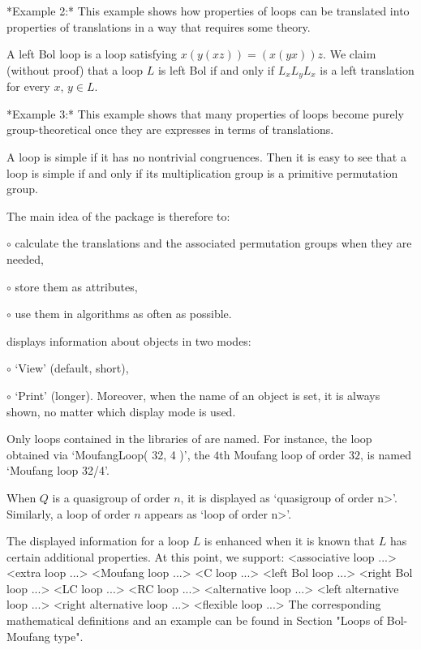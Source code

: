 *Example 2:* This example shows how properties of loops can be translated into
properties of translations in a way that requires some theory.

A left Bol loop is a loop satisfying $x(y(xz)) = (x(yx))z$. We
claim (without proof) that a loop $L$ is left Bol if and only if $L_xL_yL_x$ is
a left translation for every $x$, $y\in L$.

*Example 3:* This example shows that many properties of loops become purely
group-theoretical once they are expresses in terms of translations.

A loop is simple if it has no nontrivial congruences. Then
it is easy to see that a loop is simple if and only if its multiplication group
is a primitive permutation group.

\medskip

The main idea of the package is therefore to:
\beginlist%
\item{$\circ$} calculate the translations and the associated permutation
    groups when they are needed,
\item{$\circ$} store them as attributes,
\item{$\circ$} use them in algorithms as often as possible.
\endlist


{\GAP} displays information about objects in two modes:
\beginlist%
\item{$\circ$}
    `View' (default, short),
\item{$\circ$}
    `Print' (longer).
\endlist
Moreover, when the name of an object is set, it is always shown, no matter
which display mode is used.

Only loops contained in the libraries of {\LOOPS} are named. For instance, the
loop obtained via `MoufangLoop( 32, 4 )', the $4$th Moufang loop of order $32$,
is named `Moufang loop 32/4'.

When $Q$ is a quasigroup of order $n$, it is displayed as `\<quasigroup of
order n>'. Similarly, a loop of order $n$ appears as `\<loop of order n>'.

The displayed information for a loop $L$ is enhanced when it is known that $L$
has certain additional properties. At this point, we support:
\begintt
    <associative loop ...>
    <extra loop ...>
    <Moufang loop ...>
    <C loop ...>
    <left Bol loop ...>
    <right Bol loop ...>
    <LC loop ...>
    <RC loop ...>
    <alternative loop ...>
    <left alternative loop ...>
    <right alternative loop ...>
    <flexible loop ...>
\endtt
The corresponding mathematical definitions and an example can be found in
Section "Loops of Bol-Moufang type".

